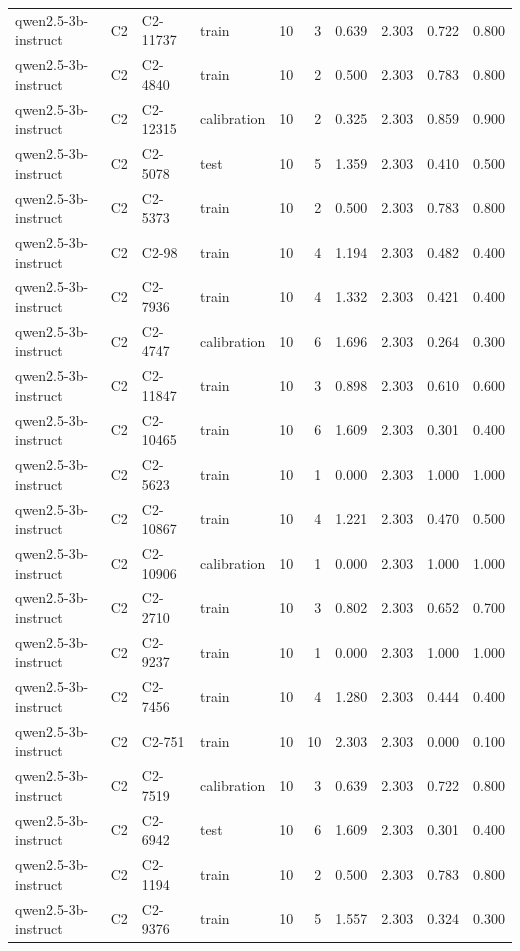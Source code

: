 \begin{table}
\begin{tabular}{llllrrrrrr}
qwen2.5-3b-instruct & C2 & C2-11737 & train & 10 & 3 & 0.639 & 2.303 & 0.722 & 0.800 \\
qwen2.5-3b-instruct & C2 & C2-4840 & train & 10 & 2 & 0.500 & 2.303 & 0.783 & 0.800 \\
qwen2.5-3b-instruct & C2 & C2-12315 & calibration & 10 & 2 & 0.325 & 2.303 & 0.859 & 0.900 \\
qwen2.5-3b-instruct & C2 & C2-5078 & test & 10 & 5 & 1.359 & 2.303 & 0.410 & 0.500 \\
qwen2.5-3b-instruct & C2 & C2-5373 & train & 10 & 2 & 0.500 & 2.303 & 0.783 & 0.800 \\
qwen2.5-3b-instruct & C2 & C2-98 & train & 10 & 4 & 1.194 & 2.303 & 0.482 & 0.400 \\
qwen2.5-3b-instruct & C2 & C2-7936 & train & 10 & 4 & 1.332 & 2.303 & 0.421 & 0.400 \\
qwen2.5-3b-instruct & C2 & C2-4747 & calibration & 10 & 6 & 1.696 & 2.303 & 0.264 & 0.300 \\
qwen2.5-3b-instruct & C2 & C2-11847 & train & 10 & 3 & 0.898 & 2.303 & 0.610 & 0.600 \\
qwen2.5-3b-instruct & C2 & C2-10465 & train & 10 & 6 & 1.609 & 2.303 & 0.301 & 0.400 \\
qwen2.5-3b-instruct & C2 & C2-5623 & train & 10 & 1 & 0.000 & 2.303 & 1.000 & 1.000 \\
qwen2.5-3b-instruct & C2 & C2-10867 & train & 10 & 4 & 1.221 & 2.303 & 0.470 & 0.500 \\
qwen2.5-3b-instruct & C2 & C2-10906 & calibration & 10 & 1 & 0.000 & 2.303 & 1.000 & 1.000 \\
qwen2.5-3b-instruct & C2 & C2-2710 & train & 10 & 3 & 0.802 & 2.303 & 0.652 & 0.700 \\
qwen2.5-3b-instruct & C2 & C2-9237 & train & 10 & 1 & 0.000 & 2.303 & 1.000 & 1.000 \\
qwen2.5-3b-instruct & C2 & C2-7456 & train & 10 & 4 & 1.280 & 2.303 & 0.444 & 0.400 \\
qwen2.5-3b-instruct & C2 & C2-751 & train & 10 & 10 & 2.303 & 2.303 & 0.000 & 0.100 \\
qwen2.5-3b-instruct & C2 & C2-7519 & calibration & 10 & 3 & 0.639 & 2.303 & 0.722 & 0.800 \\
qwen2.5-3b-instruct & C2 & C2-6942 & test & 10 & 6 & 1.609 & 2.303 & 0.301 & 0.400 \\
qwen2.5-3b-instruct & C2 & C2-1194 & train & 10 & 2 & 0.500 & 2.303 & 0.783 & 0.800 \\
qwen2.5-3b-instruct & C2 & C2-9376 & train & 10 & 5 & 1.557 & 2.303 & 0.324 & 0.300 \\

\end{tabular}
\end{table}
